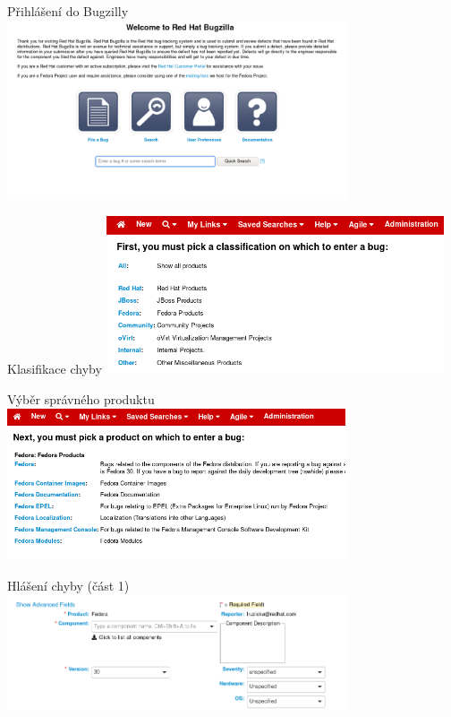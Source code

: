 \documentclass[12pt,aspectratio=169]{beamer}
\begin{document}
\begin{frame}{Přihlášení do Bugzilly}
\includegraphics[width=10cm]{images/bz_logged.png}
\end{frame}

\begin{frame}{Klasifikace chyby}
\includegraphics[width=10cm]{images/bz_classification.png}
\end{frame}

\begin{frame}{Výběr správného produktu}
\includegraphics[width=10cm]{images/bz_product.png}
\end{frame}

\begin{frame}{Hlášení chyby (část 1)}
\includegraphics[width=10cm]{images/bz_header.png}
\end{frame}
\end{document}
